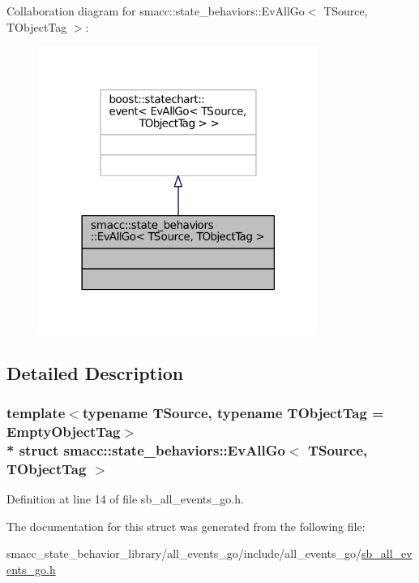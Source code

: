Collaboration diagram for smacc\+:\+:state\+\_\+behaviors\+:\+:Ev\+All\+Go$<$ T\+Source, T\+Object\+Tag $>$\+:
\nopagebreak
\begin{figure}[H]
\begin{center}
\leavevmode
\includegraphics[width=258pt]{structsmacc_1_1state__behaviors_1_1EvAllGo__coll__graph}
\end{center}
\end{figure}


\subsection{Detailed Description}
\subsubsection*{template$<$typename T\+Source, typename T\+Object\+Tag = Empty\+Object\+Tag$>$\\*
struct smacc\+::state\+\_\+behaviors\+::\+Ev\+All\+Go$<$ T\+Source, T\+Object\+Tag $>$}



Definition at line 14 of file sb\+\_\+all\+\_\+events\+\_\+go.\+h.



The documentation for this struct was generated from the following file\+:\begin{DoxyCompactItemize}
\item 
smacc\+\_\+state\+\_\+behavior\+\_\+library/all\+\_\+events\+\_\+go/include/all\+\_\+events\+\_\+go/\hyperlink{sb__all__events__go_8h}{sb\+\_\+all\+\_\+events\+\_\+go.\+h}\end{DoxyCompactItemize}
